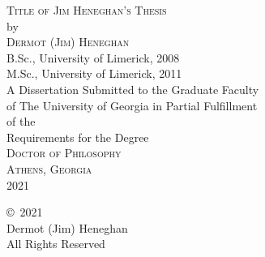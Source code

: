 \documentclass[
reprint,
amsmath,amssymb,
aip,
jap,
floatfix,
]{revtex4-2}
\newcommand{\thesisyear}{2021} %
\newcommand{\yourname}{Dermot (Jim) Heneghan} %
\newcommand{\thesistitle}{Title of Jim Heneghan's Thesis} %
\begin{document}




\newpage
\thispagestyle{empty}
\vspace*{18pt}
\begin{center}
\textsc{\thesistitle}\\[18pt]
by\\[18pt]
\textsc{\yourname}\\[12pt]

B.Sc., University of Limerick, 2008\\
M.Sc., University of Limerick, 2011\\
\vfill
A Dissertation Submitted to the Graduate Faculty \\
of The University of Georgia in Partial Fulfillment \\
of the \\
Requirements for the Degree \\[10pt]
\textsc{Doctor of Philosophy}\\[36pt]
\textsc{Athens, Georgia}\\[18pt]
\thesisyear
\end{center}

\newpage
\thispagestyle{empty}
\vspace*{5.5in}
\begin{center}
\copyright~\thesisyear\ \\
\yourname\\
All Rights Reserved
\end{center}
\end{document}
